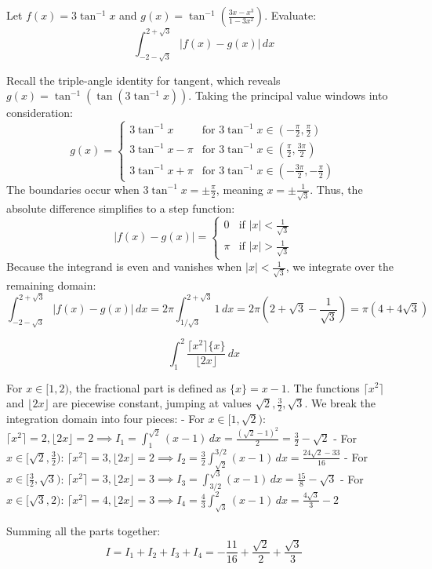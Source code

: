 \begin{questions}
\question
Let $f(x) = 3 \tan^{-1} x$ and $g(x) = \tan^{-1} \left( \frac{3x - x^3}{1 - 3x^2} \right)$. Evaluate:
\[ \int_{-2-\sqrt{3}}^{2+\sqrt{3}} |f(x) - g(x)| \,dx \]
\begin{solution}
Recall the triple-angle identity for tangent, which reveals $g(x) = \tan^{-1}(\tan(3\tan^{-1} x))$. Taking the principal value windows into consideration:
\[ g(x) = \begin{cases} 
3\tan^{-1} x & \text{for } 3\tan^{-1}x \in \left(-\frac{\pi}{2}, \frac{\pi}{2}\right) \\ 
3\tan^{-1} x - \pi & \text{for } 3\tan^{-1}x \in \left(\frac{\pi}{2}, \frac{3\pi}{2}\right) \\ 
3\tan^{-1} x + \pi & \text{for } 3\tan^{-1}x \in \left(-\frac{3\pi}{2}, -\frac{\pi}{2}\right) 
\end{cases} \]
The boundaries occur when $3\tan^{-1} x = \pm \frac{\pi}{2}$, meaning $x = \pm \frac{1}{\sqrt{3}}$.
Thus, the absolute difference simplifies to a step function:
\[ |f(x) - g(x)| = \begin{cases} 0 & \text{if } |x| < \frac{1}{\sqrt{3}} \\ \pi & \text{if } |x| > \frac{1}{\sqrt{3}} \end{cases} \]
Because the integrand is even and vanishes when $|x| < \frac{1}{\sqrt{3}}$, we integrate over the remaining domain:
\[ \int_{-2-\sqrt{3}}^{2+\sqrt{3}} |f(x) - g(x)| \,dx = 2\pi \int_{1/\sqrt{3}}^{2+\sqrt{3}} 1 \,dx = 2\pi \left( 2 + \sqrt{3} - \frac{1}{\sqrt{3}} \right) = \pi \left(4 + 4\sqrt{3}\right) \]
\end{solution}

\question
\[ \int_{1}^{2} \frac{\lceil x^2 \rceil \{x\}}{\lfloor 2x \rfloor} \,dx \]
\begin{solution}
For $x \in [1, 2)$, the fractional part is defined as $\{x\} = x - 1$. The functions $\lceil x^2 \rceil$ and $\lfloor 2x \rfloor$ are piecewise constant, jumping at values $\sqrt{2}, \frac{3}{2}, \sqrt{3}$. We break the integration domain into four pieces:
- For $x \in [1, \sqrt{2})$: $\lceil x^2 \rceil = 2, \lfloor 2x \rfloor = 2 \implies I_1 = \int_{1}^{\sqrt{2}} (x - 1) \,dx = \frac{(\sqrt{2}-1)^2}{2} = \frac{3}{2} - \sqrt{2}$
- For $x \in [\sqrt{2}, \frac{3}{2})$: $\lceil x^2 \rceil = 3, \lfloor 2x \rfloor = 2 \implies I_2 = \frac{3}{2}\int_{\sqrt{2}}^{3/2} (x - 1) \,dx = \frac{24\sqrt{2} - 33}{16}$
- For $x \in [\frac{3}{2}, \sqrt{3})$: $\lceil x^2 \rceil = 3, \lfloor 2x \rfloor = 3 \implies I_3 = \int_{3/2}^{\sqrt{3}} (x - 1) \,dx = \frac{15}{8} - \sqrt{3}$
- For $x \in [\sqrt{3}, 2)$: $\lceil x^2 \rceil = 4, \lfloor 2x \rfloor = 3 \implies I_4 = \frac{4}{3}\int_{\sqrt{3}}^{2} (x - 1) \,dx = \frac{4\sqrt{3}}{3} - 2$

Summing all the parts together:
\[ I = I_1 + I_2 + I_3 + I_4 = -\frac{11}{16} + \frac{\sqrt{2}}{2} + \frac{\sqrt{3}}{3} \]
\end{solution}

\end{questions}

